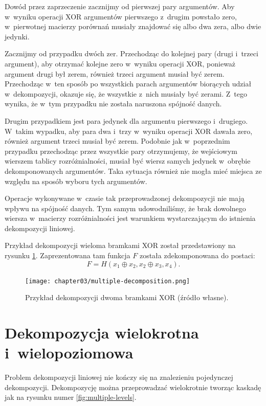 Dowód przez zaprzeczenie zacznijmy od pierwszej pary argumentów.
Aby w~wyniku operacji XOR argumentów pierwszego z~drugim powstało zero,
w~pierwotnej macierzy porównań musiały znajdować się albo dwa zera,
albo dwie jedynki.

Zacznijmy od przypadku dwóch zer.
Przechodząc do kolejnej pary (drugi i~trzeci argument),
aby otrzymać kolejne zero w~wyniku operacji XOR,
ponieważ argument drugi był zerem,
również trzeci argument musiał być zerem.
Przechodząc w~ten sposób po wszystkich parach argumentów biorących udział w~dekompozycji,
okazuje się,
że wszystkie z~nich musiały być zerami.
Z~tego wynika,
że w~tym przypadku nie została naruszona spójność danych.

Drugim przypadkiem jest para jedynek dla argumentu pierwszego i~drugiego.
W~takim wypadku,
aby para dwa i~trzy w~wyniku operacji XOR dawała zero,
również argument trzeci musiał być zerem.
Podobnie jak w~poprzednim przypadku przechodząc przez wszystkie pary otrzymujemy,
że wejściowym wierszem tablicy rozróżnialności,
musiał być wiersz samych jedynek w~obrębie dekomponowanych argumentów.
Taka sytuacja również nie mogła mieć miejsca ze względu na sposób wyboru tych argumentów.

Operacje wykonywane w~czasie tak przeprowadzonej dekompozycji nie mają wpływu na spójność danych.
Tym samym udowodniliśmy,
że brak dowolnego wiersza w~macierzy rozróżnialności jest warunkiem wystarczającym do istnienia dekompozycji liniowej.

Przykład dekompozycji wieloma bramkami XOR został przedstawiony na rysunku \ref{fig:multiple}.
Zaprezentowana tam funkcja $F$ została zdekomponowana do postaci:
\begin{equation}
F = H(x_1 \oplus x_2, x_2 \oplus x_3, x_4).
\end{equation}

\begin{figure}[h]
\centering
\texttt{[image: chapter03/multiple-decomposition.png]}
\caption{Przykład dekompozycji dwoma bramkami XOR (źródło własne).}
\label{fig:multiple}
\end{figure}

\section{Dekompozycja wielokrotna i~wielopoziomowa}

Problem dekompozycji liniowej nie kończy się na znalezieniu pojedynczej dekompozycji.
Dekompozycję można przeprowadzać wielokrotnie tworząc kaskadę jak na rysunku numer \ref{fig:multiple-levels}.

